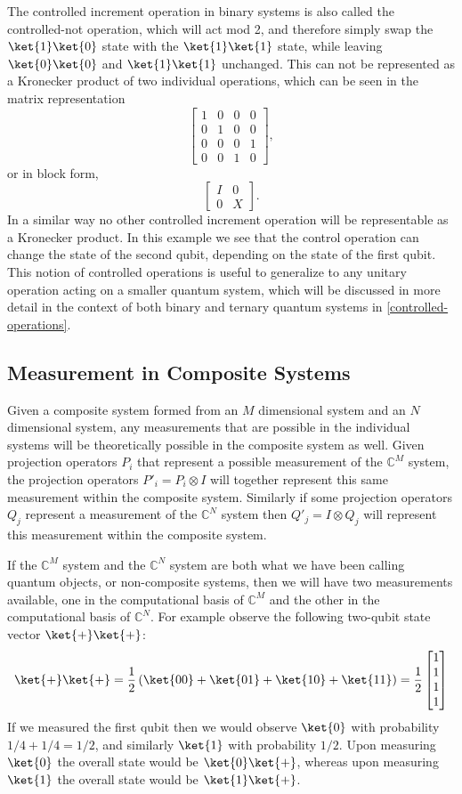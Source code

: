 The controlled increment operation in binary systems is also called the controlled-not operation, which will act mod 2, and therefore simply swap the $\ket{1}\ket{0}$ state with the $\ket{1}\ket{1}$ state, while leaving $\ket{0}\ket{0}$ and $\ket{1}\ket{1}$ unchanged. This can not be represented as a Kronecker product of two individual operations, which can be seen in the matrix representation
\[
\left[\begin{matrix}
1&0&0&0\\
0&1&0&0\\
0&0&0&1\\
0&0&1&0
\end{matrix}\right],
\]
or in block form,
\[\begin{bmatrix}
I & 0 \\
0 & X
\end{bmatrix}.\]
In a similar way no other controlled increment operation will be representable as a Kronecker product. In this example we see that the control operation can change the state of the second qubit, depending on the state of the first qubit. This notion of controlled operations is useful to generalize to any unitary operation acting on a smaller quantum system, which will be discussed in more detail in the context of both binary and ternary quantum systems in \autoref{controlled-operations}.
\subsection{Measurement in Composite Systems}\label{composite-measurement}
Given a composite system formed from an $M$ dimensional system and an $N$ dimensional system, any measurements that are possible in the individual systems will be theoretically possible in the composite system as well. Given projection operators $P_i$ that represent a possible measurement of the $\mathbb{C}^M$ system, the projection operators $P'_i = P_i \otimes I$ will together represent this same measurement within the composite system. Similarly if some projection operators $Q_j$ represent a measurement of the $\mathbb{C}^N$ system then $Q'_j = I\otimes Q_j$ will represent this measurement within the composite system.

If the $\mathbb{C}^M$ system and the $\mathbb{C}^N$ system are both what we have been calling quantum objects, or non-composite systems, then we will have two measurements available, one in the computational basis of $\mathbb{C}^M$ and the other in the computational basis of $\mathbb{C}^N$. For example observe the following two-qubit state vector $\ket{+}\ket{+}$:
\[\ket{+}\ket{+}=\frac{1}{2}\left(\ket{00}+\ket{01}+\ket{10}+\ket{11}\right)=\frac{1}{2}\left[\begin{matrix}
	1\\
	1\\
	1\\
	1
\end{matrix}\right]\]
If we measured the first qubit then we would observe $\ket{0}$ with probability $1/4+1/4 = 1/2$, and similarly $\ket{1}$ with probability $1/2$. Upon measuring $\ket{0}$ the overall state would be $\ket{0}\ket{+}$, whereas upon measuring $\ket{1}$ the overall state would be $\ket{1}\ket{+}$.

